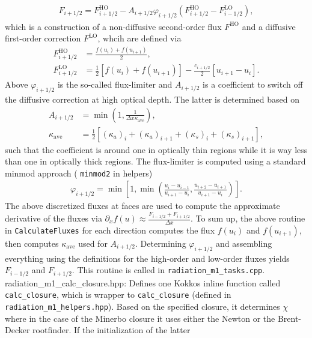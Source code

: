 \documentclass{article}
\newcommand{\var}[1]{%
  {\setlength{\fboxsep}{1.5pt}%
   \colorbox{varbg}{\textcolor{varfg}{\texttt{\small #1}}}}}
\begin{document}
\begin{align}
  F_{i+1/2}=F_{i+1/2}^{\mathrm{HO}}-A_{i+1/2}\varphi_{i+1/2}\left(F_{i+1/2}^{\mathrm{HO}}-F_{i-1/2}^{\mathrm{LO}}\right),
\end{align}
which is a construction of a non-diffusive second-order flux $F^{\mathrm{HO}}$ and a diffusive first-order correction $F^{\mathrm{LO}}$, whcih are defined via
\begin{align}
  F_{i+1/2}^{\mathrm{HO}}&=\frac{f(u_i)+f(u_{i+1})}{2},\\
  F_{i+1/2}^{\mathrm{LO}}&=\frac{1}{2}[f(u_i)+f(u_{i+1})]-\frac{c_{i+1/2}}{2}[u_{i+1}-u_i].
\end{align}
Above $\varphi_{i+1/2}$ is the so-called flux-limiter and $A_{i+1/2}$ is a coefficient to switch off the diffusive correction at high optical depth. The latter is determined based on
\begin{align}
  A_{i+1/2}&=\min{\left(1,\frac{1}{\Delta x\kappa_{\mathrm{ave}}}\right)},\\
  \kappa_{\mathrm{ave}}&=\frac{1}{2}[(\kappa_a)_i+(\kappa_a)_{i+1}+(\kappa_s)_i+(\kappa_s)_{i+1}],
\end{align}
such that the coefficient is around one in optically thin regions while it is way less than one in optically thick regions. The flux-limiter is computed using a standard minmod approach (\var{minmod2} in helpers)
\begin{align}
  \varphi_{i+1/2}=\min{\left[1,\min{\left(\frac{u_i-u_{i-1}}{u_{i+1}-u_i},\frac{u_{i+2}-u_{i+1}}{u_{i+1}-u_i}\right)}\right]}.
\end{align}
The above discretized fluxes at faces are used to compute the approximate derivative
of the fluxes via $\partial_xf(u)\approx \frac{F_{i-1/2}+F_{i+1/2}}{\Delta x}$. To sum up, the above routine in \var{CalculateFluxes} for each direction computes the flux $f(u_i)$ and $f(u_{i+1})$, then computes $\kappa_{\mathrm{ave}}$ used for
$A_{i+1/2}$. Determining $\varphi_{i+1/2}$ and assembling everything using the definitions for the high-order and low-order fluxes yields $F_{i-1/2}$ and $F_{i+1/2}$. This
routine is called in \var{radiation\_m1\_tasks.cpp}.\\
{\color{gray}radiation\_m1\_calc\_closure.hpp:} Defines one Kokkos inline function called \var{calc\_closure}, which is wrapper to \var{calc\_closure} (defined in \var{radiation\_m1\_helpers.hpp}).
Based on the specified closure, it determines $\chi$ where in the case of the Minerbo closure it uses either the Newton or the Brent-Decker rootfinder. If the initialization of the latter
\end{document}
